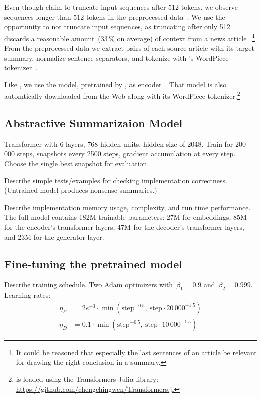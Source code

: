 Even though \citeauthor{LiuL2019} claim to truncate input sequences after 512 tokens, we observe sequences longer than 512 tokens in the preprocessed data~\cite{LiuL2019}.
We use the opportunity to not truncate input sequences, as truncating after only 512 discards a reasonable amount~(33\,\% on average) of context from a news article~\cite{NallapatiZSGX2016}.\footnote{It could be reasoned that especially the last sentences of an article be relevant for drawing the right conclusion in a summary.}
From the preprocessed data we extract pairs of each source article with its target summary, normalize sentence separators, and tokenize with \Bert's WordPiece tokenizer~\cite{DevlinCLT2019}.

Like \citeauthor{LiuL2019}, we use the \BertBase model, pretrained by \citeauthor{DevlinCLT2019}, as encoder~\cite{DevlinCLT2019}.
That \Bert model is also automtically downloaded from the Web along with its WordPiece tokenizer.\footnote{\BertBase is loaded using the Transformers Julia library: \url{https://github.com/chengchingwen/Transformers.jl}}

\subsection{Abstractive Summarizaion Model}

Transformer with 6 layers, 768 hidden units, hidden size of 2048.
Train for 200\,000 steps, snapshots every 2500 steps, gradient accumulation at every step.
Choose the single best snapshot for evaluation.

Describe simple tests/examples for checking implementation correctness. (Untrained model produces nonsense summaries.)

Describe implementation memory usage, complexity, and run time performance.
The full \BertSumAbs model contains 182M trainable parameters: 27M for embeddings, 85M for the encoder's transformer layers, 47M for the decoder's transformer layers, and 23M for the generator layer.

\subsection{Fine-tuning the pretrained model}

Describe training schedule.
Two Adam optimizers with~\(\beta_1 = 0.9\) and~\(\beta_2 = 0.999\).
Learning rates:
\begin{align}
    \eta_E &= 2e^{-3} \cdot \min( \text{step}^{-0.5},\ \text{step} \cdot 20\,000^{-1.5} ) \\
    \eta_D &= 0.1 \cdot \min( \text{step}^{-0.5},\ \text{step} \cdot 10\,000^{-1.5} )
\end{align}

